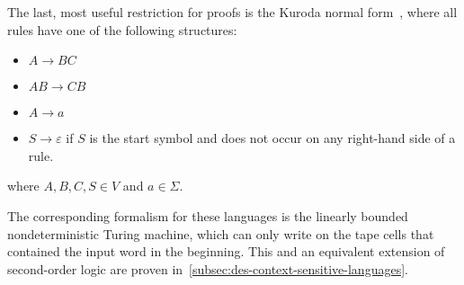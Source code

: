 The last, most useful restriction for proofs is the Kuroda normal form~\cite{Pettorossi2022}, where all rules have one of the following structures:
\begin{itemize}
    \setlength\itemsep{0.2em}
    \item $A \to BC$
    \item $AB \to CB$
    \item $A \to a$
    \item $S \to \varepsilon$ if $S$ is the start symbol and does not occur on any right-hand side of a rule.
\end{itemize}
where $A, B, C, S \in V$ and $a \in \Sigma$.

The corresponding formalism for these languages is the linearly bounded nondeterministic Turing machine, which can only write on the tape cells that contained the input word in the beginning.
This and an equivalent extension of second-order logic are proven in~\cref{subsec:des-context-sensitive-languages}.
